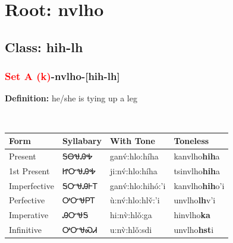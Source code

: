 \needspace{4in}
\section*{Root: nvlho}
\nopagebreak
{}
\needspace{3in}
\subsection*{Class: hih-lh}
\nopagebreak
\needspace{2in}
\subsubsection*{\textcolor{Red}{Set A (k)}{-}\textbf{nvlho}{-}[hih-lh]}
\nopagebreak
\textbf{Definition: } he/she is tying up a leg
\\[0.5em]
\begin{tabularx}{\textwidth}{l X X X}%
\toprule%
\textbf{Form}&\textbf{Syllabary}&\textbf{With Tone}&\textbf{Toneless}\\%
\midrule%
Present&ᎦᎾᏠᎯᎭ&ganv́:hlo:híha&kanvlho\textbf{hih}a\\%
1st Present&ᏥᏅᏠᎯᎭ&ji:nv́:hlo:híha&tsinvlho\textbf{hih}a\\%
Imperfective&ᎦᏅᏠᎯᎰᎢ&ganv́:hlo:hihó:’i&kanvlho\textbf{hih}o'i\\%
Perfective&ᎤᏅᏠᏢᎢ&ù:nv́:hlo:hlv̌:’i&unvlho\textbf{lh}v'i\\%
Imperative&ᎯᏅᏠᎦ&hi:nv̀:hlǒ:ga&hinvlho\textbf{ka}\\%
Infinitive&ᎤᏅᏠᏍᏗ&u:nv̀:hlǒ:sdi&unvlho\textbf{hst}i\\%
\bottomrule%
\end{tabularx}
\\[1em]